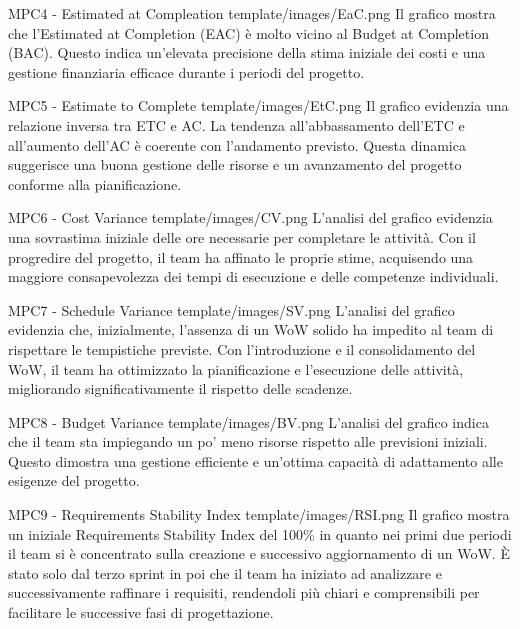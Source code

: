 \Met
{ %
    MPC4 - Estimated at Compleation
}
{ %
    template/images/EaC.png
}
{ %
    Il grafico mostra che l'Estimated at Completion (EAC) è molto vicino al Budget at Completion (BAC).
    Questo indica un'elevata precisione della stima iniziale dei costi e una gestione finanziaria efficace durante i periodi del progetto. 
}

\Met
{ %
    MPC5 - Estimate to Complete
}
{ %
    template/images/EtC.png
}
{ %
    Il grafico evidenzia una relazione inversa tra ETC e AC.
    La tendenza all'abbassamento dell'ETC e all'aumento dell'AC è coerente con l'andamento previsto. 
    Questa dinamica suggerisce una buona gestione delle risorse e un avanzamento del progetto conforme alla pianificazione.
}

\Met
{ %
    MPC6 - Cost Variance
}
{ %
    template/images/CV.png
}
{ %
    L'analisi del grafico evidenzia una sovrastima iniziale delle ore necessarie per completare le attività.
    Con il progredire del progetto, il team ha affinato le proprie stime, acquisendo una maggiore consapevolezza dei tempi di esecuzione e delle competenze individuali.
}

\Met
{ %
    MPC7 - Schedule Variance
}
{ %
    template/images/SV.png
}
{ %
    L'analisi del grafico evidenzia che, inizialmente, l'assenza di un WoW solido ha impedito al team di rispettare le tempistiche previste. 
    Con l'introduzione e il consolidamento del WoW, il team ha ottimizzato la pianificazione e l'esecuzione delle attività, migliorando significativamente il rispetto delle scadenze.
}

\Met
{ %
    MPC8 - Budget Variance
}
{ %
    template/images/BV.png
}
{ %
    L'analisi del grafico indica che il team sta impiegando un po' meno risorse rispetto alle previsioni iniziali.
    Questo dimostra una gestione efficiente e un'ottima capacità di adattamento alle esigenze del progetto.
}

\Met
{ %
    MPC9 - Requirements Stability Index
}
{ %
    template/images/RSI.png
}
{ %
    Il grafico mostra un iniziale Requirements Stability Index del 100\% in quanto nei primi due periodi il team si è
    concentrato sulla creazione e successivo aggiornamento di un WoW. 
    È stato solo dal terzo sprint in poi che il team ha iniziato ad analizzare e successivamente raffinare i requisiti, rendendoli più chiari e comprensibili per facilitare le successive fasi di progettazione.
}

